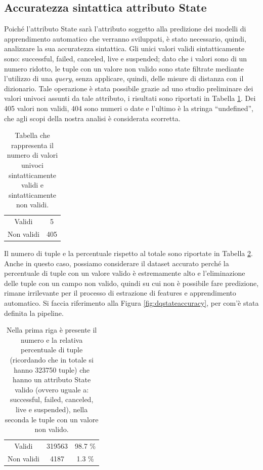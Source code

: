 \subsection{Accuratezza sintattica attributo State}
Poiché l'attributo State sarà l'attributo soggetto alla predizione dei modelli di apprendimento automatico che verranno sviluppati, è stato necessario, quindi, analizzare la sua accuratezza sintattica.
Gli unici valori validi sintatticamente sono: successful, failed, canceled, live e suspended; dato che i valori sono di un numero ridotto, le tuple con un valore non valido sono state filtrate mediante l'utilizzo di una \textit{query}, senza applicare, quindi, delle misure di distanza con il dizionario. 
Tale operazione è stata possibile grazie ad uno studio preliminare dei valori univoci assunti da tale attributo, i risultati sono riportati in Tabella \ref{tab:unique_state}.
Dei 405 valori non validi, 404 sono numeri o date e l'ultimo è la stringa “undefined”, che agli scopi della nostra analisi è considerata scorretta. 
\begin{table}
	\caption{Tabella che rappresenta il numero di valori univoci sintatticamente validi e sintatticamente non validi.}
	
	\label{tab:unique_state}
	
	\centering
	\begin{tabular}{c|c}
		Validi & 5\\ 
		Non validi & 405 \\
	\end{tabular}
\end{table} 
Il numero di tuple e la percentuale rispetto al totale sono riportate in Tabella \ref{tab:acc_state}.
Anche in questo caso, possiamo considerare il dataset accurato perché la percentuale di tuple con un valore valido è estremamente alto e l'eliminazione delle tuple con un campo non valido, quindi su cui non è possibile fare predizione, rimane irrilevante per il processo di estrazione di features e apprendimento automatico.
Si faccia riferimento alla Figura \ref{fig:dqstateaccuracy}, per com'è stata definita la pipeline.
\begin{table}
	\caption{Nella prima riga è presente il numero e la relativa percentuale di tuple (ricordando che in totale si hanno 323750 tuple) che hanno un attributo State valido (ovvero uguale a: successful, failed, canceled, live e suspended), nella seconda le tuple con un valore non valido.}
	
	\label{tab:acc_state}
	
	\centering
	\begin{tabular}{c|cc}
		Validi & 319563 & 98.7 \% \\ 
		Non validi & 4187 & 1.3 \% \\
	\end{tabular}
\end{table} 

